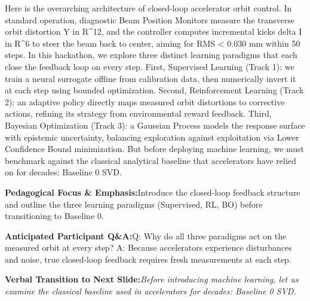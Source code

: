 \documentclass[11pt,a4paper]{article}
\begin{document}
\begin{tcolorbox}[colback=white,colframe=primaryblue,title={\footnotesize\bfseries\color{white}Spoken Presenter Script},fontupper=\small,left=6pt,right=6pt,top=3pt,bottom=3pt,boxrule=0.8pt,arc=2.5pt]
Here is the overarching architecture of closed-loop accelerator orbit control. In standard operation, diagnostic Beam Position Monitors measure the transverse orbit distortion Y in R\textasciicircum{}12, and the controller computes incremental kicks delta I in R\textasciicircum{}6 to steer the beam back to center, aiming for RMS < 0.030 mm within 50 steps. In this hackathon, we explore three distinct learning paradigms that each close the feedback loop on every step. First, Supervised Learning (Track 1): we train a neural surrogate offline from calibration data, then numerically invert it at each step using bounded optimization. Second, Reinforcement Learning (Track 2): an adaptive policy directly maps measured orbit distortions to corrective actions, refining its strategy from environmental reward feedback. Third, Bayesian Optimization (Track 3): a Gaussian Process models the response surface with epistemic uncertainty, balancing exploration against exploitation via Lower Confidence Bound minimization. But before deploying machine learning, we must benchmark against the classical analytical baseline that accelerators have relied on for decades: Baseline 0 SVD.
\end{tcolorbox}
\vspace{0.2em}
\begin{tcolorbox}[colback=lightbg,colframe=bordergray,left=6pt,right=6pt,top=3pt,bottom=3pt,boxrule=0.6pt,arc=2.5pt]
\small
\noindent\textbf{\color{navy}Pedagogical Focus \& Emphasis:}\enspace Introduce the closed-loop feedback structure and outline the three learning paradigms (Supervised, RL, BO) before transitioning to Baseline 0.\par\vspace{0.3em}
\noindent\textbf{\color{successgreen}Anticipated Participant Q\&A:}\enspace Q: Why do all three paradigms act on the measured orbit at every step? A: Because accelerators experience disturbances and noise, true closed-loop feedback requires fresh measurements at each step.\par\vspace{0.3em}
\noindent\textbf{\color{accent}Verbal Transition to Next Slide:}\enspace \emph{Before introducing machine learning, let us examine the classical baseline used in accelerators for decades: Baseline 0 SVD.}
\end{tcolorbox}
\end{document}
